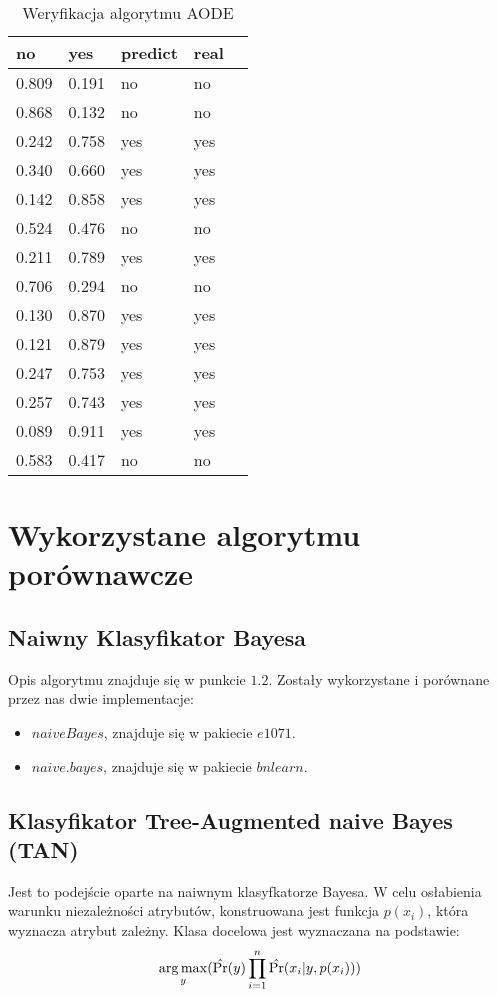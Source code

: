 \documentclass[16]{article}
\begin{document}
\begin{table}[ht]
\begin{center}
\begin{tabular}{|l|l|l|l|l|}
\hline
\textbf{no} & \textbf{yes} & \textbf{predict} & \textbf{real}
\\ \hline
0.809 & 0.191 & no & no
\\ \hline
0.868 & 0.132 & no & no
\\ \hline
0.242 & 0.758 & yes & yes
\\ \hline
0.340 & 0.660 & yes & yes
\\ \hline
0.142 & 0.858 & yes & yes
\\ \hline
0.524 & 0.476 & no & no
\\ \hline
0.211 & 0.789 & yes & yes
\\ \hline
0.706 & 0.294 & no & no
\\ \hline
0.130 & 0.870 & yes & yes
\\ \hline
0.121 & 0.879 & yes & yes
\\ \hline
0.247 & 0.753 & yes & yes
\\ \hline
0.257 & 0.743 & yes & yes
\\ \hline
0.089 & 0.911 & yes & yes
\\ \hline
0.583 & 0.417 & no & no
\\ \hline
\end{tabular}
\caption{Weryfikacja algorytmu AODE}
\end{center}
\end{table}
\clearpage
\section{Wykorzystane algorytmu porównawcze}

\subsection{Naiwny Klasyfikator Bayesa}
Opis algorytmu znajduje się w punkcie $1.2$.  Zostały wykorzystane i porównane przez nas dwie implementacje:
\begin{itemize}
\item $naiveBayes$, znajduje się w pakiecie $e1071$.
\item $naive.bayes$, znajduje się w pakiecie $bnlearn$.
\end{itemize}
\subsection{Klasyfikator Tree-Augmented naive Bayes (TAN)}
Jest to podejście oparte na naiwnym klasyfkatorze Bayesa. W celu osłabienia warunku niezależności atrybutów, konstruowana jest funkcja $p(x_{i})$, która wyznacza atrybut zależny. Klasa docelowa jest wyznaczana na podstawie:
\begin{equation}
 \operatorname*{arg\,max}_\mathnormal{y} (\hat{\Pr}(\mathnormal{y}) \prod_{i=1}^{n} \hat{\Pr}(x_{i}|\mathnormal{y}, p(x_{i})))
\end{equation} 
\end{document}
